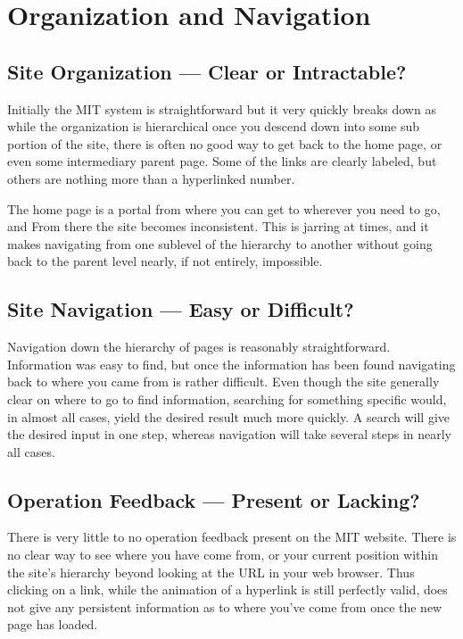 \section*{Organization and Navigation}
\subsection*{Site Organization --- Clear or Intractable?}

Initially the MIT system is straightforward but it very quickly breaks down as while
the organization is hierarchical once you descend down into some sub portion of
the site, there is often no good way to get back to the home page, or even some
intermediary parent page. Some of the links are clearly labeled, but others are
nothing more than a hyperlinked number.

The home page is a portal from where you can get to wherever you need to go, and
From there the site becomes inconsistent. This is jarring at times, and it makes
navigating from one sublevel of the hierarchy to another without going back to the
parent level nearly, if not entirely, impossible.

\subsection*{Site Navigation --- Easy or Difficult?}

Navigation down the hierarchy of pages is reasonably straightforward. Information
was easy to find, but once the information has been found navigating back to where
you came from is rather difficult. Even though the site generally clear on where to
go to find information, searching for something specific would, in almost all cases,
yield the desired result much more quickly. A search will give the desired input in
one step, whereas navigation will take several steps in nearly all cases.

\subsection*{Operation Feedback --- Present or Lacking?}

There is very little to no operation feedback present on the MIT website. There is no 
clear way to see where you have come from, or your current
position within the site's hierarchy beyond looking at the URL in your web browser. Thus
clicking on a link, while the animation of a hyperlink is still perfectly valid, does not
give any persistent information as to where you've come from once the new page has loaded.

